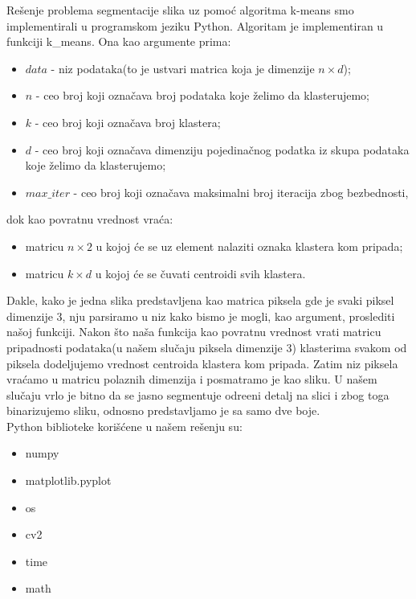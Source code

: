 \documentclass{article}
\begin{document}
\begin{itemize}
Re\v{s}enje problema segmentacije slika uz pomo\'{c} algoritma {\selectfont k-means} smo implementirali u programskom jeziku {\selectfont Python}. Algoritam je implementiran u funkciji {\selectfont k\_means}. Ona kao argumente prima:
\begin{itemize}
\item $data$ - niz podataka(to je ustvari matrica koja je dimenzije $n \times d$);
\item $n$ - ceo broj koji ozna\v{c}ava broj podataka koje \v{z}elimo da klasterujemo;
\item $k$ - ceo broj koji ozna\v{c}ava broj klastera;
\item $d$ - ceo broj koji ozna\v{c}ava dimenziju pojedina\v{c}nog podatka iz skupa podataka koje \v{z}elimo da klasterujemo;
\item $max\_iter$ - ceo broj koji ozna\v{c}ava maksimalni broj iteracija zbog bezbednosti,
\end{itemize}
dok kao povratnu vrednost vra\'{c}a:
\begin{itemize} 
\item matricu $n \times 2$ u kojoj \'{c}e se uz element nalaziti oznaka klastera kom pripada;
\item matricu $k \times d$ u kojoj \'{c}e se \v{c}uvati centroidi svih klastera.
\end{itemize}
Dakle, kako je jedna slika predstavljena kao matrica piksela gde je svaki piksel dimenzije 3, nju parsiramo u niz kako bismo je mogli, kao argument, proslediti na\v{s}oj funkciji. Nakon \v{s}to na\v{s}a funkcija kao povratnu vrednost vrati matricu pripadnosti podataka(u na\v{s}em slu\v{c}aju piksela dimenzije 3) klasterima svakom od piksela dodeljujemo vrednost centroida klastera kom pripada. Zatim niz piksela vra\'{c}amo u matricu polaznih dimenzija i posmatramo je kao sliku. U na\v{s}em slu\v{c}aju vrlo je bitno da se jasno segmentuje odre\dj eni detalj na slici i zbog toga binarizujemo sliku, odnosno predstavljamo je sa samo dve boje.\\
{\selectfont Python} biblioteke kori\v{s}\'{c}ene u na\v{s}em re\v{s}enju su:
\selectfont
\begin{itemize}
\item numpy
\item matplotlib.pyplot
\item os
\item cv2
\item time
\item math
\end{itemize}
\selectfont


\end{itemize}
\end{document}
